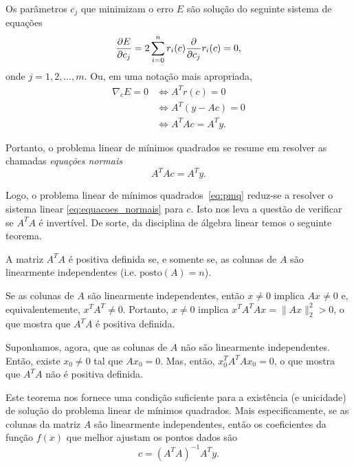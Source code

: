 Os parâmetros $c_j$ que minimizam o erro $E$ são solução do seguinte sistema de equações
\begin{equation}
  \frac{\partial E}{\partial c_j} = 2\sum_{i=0}^n r_i(c)\frac{\partial}{\partial c_j}r_i(c) = 0,
\end{equation}
onde $j=1, 2, \dotsc, m$. Ou, em uma notação mais apropriada,
\begin{align}
  \nabla_c E = 0 &\Leftrightarrow A^Tr(c) = 0\\
  &\Leftrightarrow A^T(y - Ac) = 0\\
  &\Leftrightarrow A^TAc = A^Ty.
\end{align}

Portanto, o problema linear de mínimos quadrados se resume em resolver as chamadas \emph{equações normais}
\begin{equation}\label{eq:equacoes_normais}
  A^TAc= A^Ty.
\end{equation}

Logo, o problema linear de mínimos quadrados~\eqref{eq:pmq} reduz-se a resolver o sistema linear \eqref{eq:equacoes_normais} para $c$. Isto nos leva a questão de verificar se $A^TA$ é invertível. De sorte, da disciplina de álgebra linear temos o seguinte teorema.

\begin{teo}
  A matriz $A^TA$ é positiva definida se, e somente se, as colunas de $A$ são linearmente independentes (i.e. $\text{posto}(A)=n$).
\end{teo}
\begin{dem}
  Se as colunas de $A$ são linearmente independentes, então $x\neq 0$ implica $Ax\neq 0$ e, equivalentemente, $x^TA^T\neq 0$. Portanto, $x\neq 0$ implica $x^TA^TAx = \|Ax\|_2^2 > 0$, o que mostra que $A^TA$ é positiva definida.

  Suponhamos, agora, que as colunas de $A$ não são linearmente independentes. Então, existe $x_0\neq 0$ tal que $Ax_0 = 0$. Mas, então, $x_0^TA^TAx_0=0$, o que mostra que $A^TA$ não é positiva definida. 
\end{dem}

Este teorema nos fornece uma condição suficiente para a existência (e unicidade) de solução do problema linear de mínimos quadrados. Mais especificamente, se as colunas da matriz $A$ são linearmente independentes, então os coeficientes da função $f(x)$ que melhor ajustam os pontos dados são
\begin{equation}
  c = (A^TA)^{-1}A^Ty.
\end{equation}

